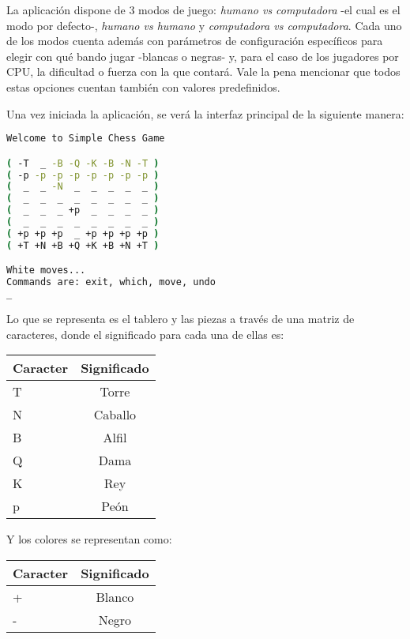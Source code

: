 \documentclass{llncs}
\begin{document}
La aplicación dispone de 3 modos de juego: \textit{humano vs computadora} -el cual es el modo por defecto-, \textit{humano vs humano} y \textit{computadora vs computadora}. Cada uno de los modos cuenta además con parámetros de configuración específicos para elegir con qué bando jugar -blancas o negras- y, para el caso de los jugadores por CPU, la dificultad o fuerza con la que contará. Vale la pena mencionar que todos estas opciones cuentan también con valores predefinidos.

Una vez iniciada la aplicación, se verá la interfaz principal de la siguiente manera:

\begin{lstlisting}[frame=single, language=bash, caption=Interfaz principal del programa, label={lst:interfaz_principal}]
Welcome to Simple Chess Game

( -T  _ -B -Q -K -B -N -T )
( -p -p -p -p -p -p -p -p )
(  _  _ -N  _  _  _  _  _ )
(  _  _  _  _  _  _  _  _ )
(  _  _  _ +p  _  _  _  _ )
(  _  _  _  _  _  _  _  _ )
( +p +p +p  _ +p +p +p +p )
( +T +N +B +Q +K +B +N +T )

White moves...
Commands are: exit, which, move, undo
_
\end{lstlisting}

Lo que se representa es el tablero y las piezas a través de una matriz de caracteres, donde el significado para cada una de ellas es:
\newline

\setlength{\tabcolsep}{20pt}
\begin{tabular}{ l | c }
  Caracter & Significado \\
  \hline
  T & Torre \\
  N & Caballo \\
  B & Alfil \\
  Q & Dama \\
  K & Rey \\
  p & Peón \\
\end{tabular}
\newline
\newline

Y los colores se representan como:
\newline

\setlength{\tabcolsep}{20pt}
\begin{tabular}{ l | c }
  Caracter & Significado \\
  \hline
  + & Blanco \\
  - & Negro \\
\end{tabular}
\newline
\newline
\end{document}
